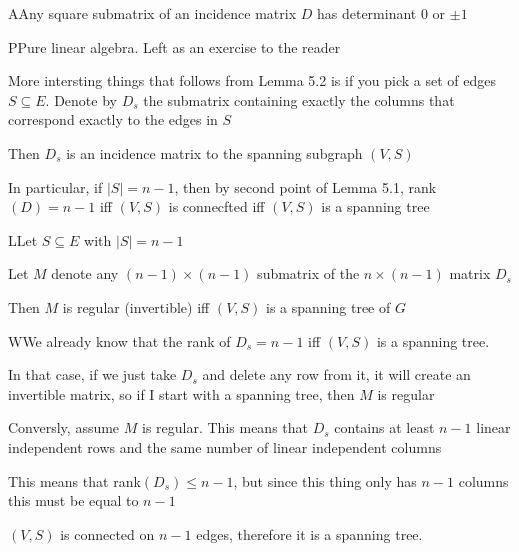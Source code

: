 \par\bigskip
\begin{lem}
  AAny square submatrix of an incidence matrix $D$ has determinant 0 or $\pm1$
\end{lem}
\par\bigskip
\begin{prf}
  PPure linear algebra. Left as an exercise to the reader 
\end{prf}
\par\bigskip
\noindent More intersting things that follows from Lemma 5.2 is if you pick a set of edges $S\subseteq E$. Denote by $D_s$ the submatrix containing exactly the columns that correspond exactly to the edges in $S$
\par\bigskip
\noindent Then $D_s$ is an incidence matrix to the spanning subgraph $(V,S)$
\par\bigskip
\noindent In particular, if $\left|S\right| = n-1$, then by second point of Lemma 5.1, rank$(D) = n-1$ iff $(V,S)$ is connecfted iff $(V,S)$ is a spanning tree 
\par\bigskip
\begin{lem}
  LLet $S\subseteq E$ with $\left|S\right| = n-1$\par
  \noindent Let $M$ denote any $(n-1)\times(n-1)$ submatrix of the $n\times(n-1)$ matrix $D_s$
  \par\bigskip
  \noindent Then $M$ is regular (invertible) iff $(V,S)$ is a spanning tree of $G$
\end{lem}
\par\bigskip
\begin{prf}
  WWe already know that the rank of $D_s = n-1$ iff $(V,S)$ is a spanning tree.\par
  \noindent In that case, if we just take $D_s$ and delete any row from it, it will create an invertible matrix, so if I start with a spanning tree, then $M$ is regular
  \par\bigskip
  \noindent Conversly, assume $M$ is regular. This means that $D_s$ contains at least $n-1$ linear independent rows and the same number of linear independent columns\par
  \noindent This means that rank$(D_s)\leq n-1$, but since this thing only has $n-1$ columns this must be equal to $n-1$\par
  \noindent $(V,S)$ is connected on $n-1$ edges, therefore it is a spanning tree.
  \par\bigskip
\end{prf}
\par\bigskip
